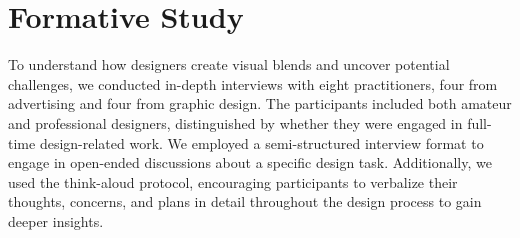 \section{Formative Study}




To understand how designers create visual blends and uncover potential challenges, we conducted in-depth interviews with eight practitioners, four from advertising and four from graphic design.
The participants included both amateur and professional designers, distinguished by whether they were engaged in full-time design-related work.
We employed a semi-structured interview format to engage in open-ended discussions about a specific design task. 
Additionally, we used the think-aloud protocol, encouraging participants to verbalize their thoughts, concerns, and plans in detail throughout the design process to gain deeper insights.




